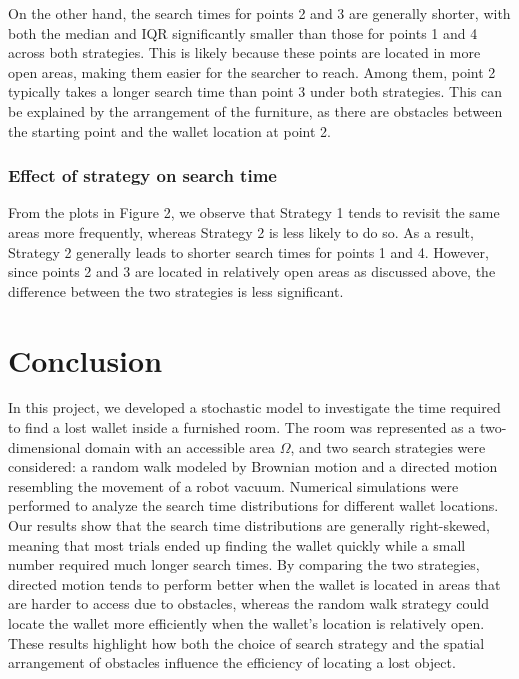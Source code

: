 \documentclass{article}
\begin{document}
\vspace{3mm}

\noindent On the other hand, the search times for points 2 and 3 are generally shorter, with both the median and IQR significantly smaller than those for points 1 and 4 across both strategies. This is likely because these points are located in more open areas, making them easier for the searcher to reach. Among them, point 2 typically takes a longer search time than point 3 under both strategies. This can be explained by the arrangement of the furniture, as there are obstacles between the starting point and the wallet location at point 2.

\subsubsection*{Effect of strategy on search time}
From the plots in Figure 2, we observe that Strategy 1 tends to revisit the same areas more frequently, whereas Strategy 2 is less likely to do so. As a result, Strategy 2 generally leads to shorter search times for points 1 and 4. However, since points 2 and 3 are located in relatively open areas as discussed above, the difference between the two strategies is less significant.





\section{Conclusion}
In this project, we developed a stochastic model to investigate the time required to find a lost wallet inside a furnished room. The room was represented as a two-dimensional domain with an accessible area $\Omega$, and two search strategies were considered: a random walk modeled by Brownian motion and a directed motion resembling the movement of a robot vacuum. Numerical simulations were performed to analyze the search time distributions for different wallet locations. Our results show that the search time distributions are generally right-skewed, meaning that most trials ended up finding the wallet quickly while a small number required much longer search times. By comparing the two strategies, directed motion tends to perform better when the wallet is located in areas that are harder to access due to obstacles, whereas the random walk strategy could locate the wallet more efficiently when the wallet's location is relatively open. These results highlight how both the choice of search strategy and the spatial arrangement of obstacles influence the efficiency of locating a lost object.
\end{document}
